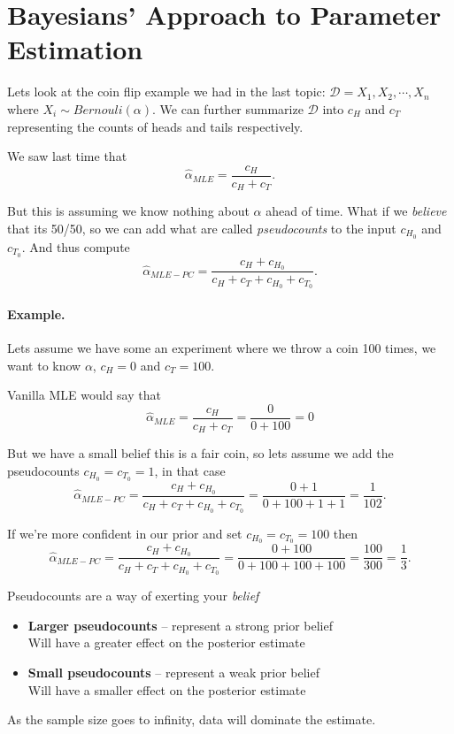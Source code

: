 \section{Bayesians' Approach to Parameter Estimation}
Lets look at the coin flip example we had in the last topic: 
 $\mathcal{D} = X_1, X_2, \cdots, X_n$ 
where $X_i \sim Bernouli(\alpha)$.
We can further summarize $\mathcal{D}$ into $c_H$ and $c_T$ 
representing the counts of heads and tails respectively. 

We saw last time that \[\hat\alpha_{MLE} = \frac{c_H}{c_H+c_T}.\]

But this is assuming we know nothing about $\alpha$ ahead of time. 
What if we \textit{believe} that its 50/50, so we can add what are called \emph{pseudocounts}
to the input $c_{H_0}$ and $c_{T_0}$.
And thus compute 
\[\hat\alpha_{MLE-PC} = \frac{c_H+c_{H_0}}{c_H+c_T+c_{H_0}+c_{T_0}}.\]

\paragraph{Example. }
Lets assume we have some an experiment where we throw a coin 100 times, we want to know $\alpha$, $c_H=0$ and $c_T=100$.

Vanilla MLE would say that 
\[\hat\alpha_{MLE} = \frac{c_H}{c_H+c_T} = \frac{0}{0 + 100} = 0\]
  
But we have a small belief this is a fair coin, so lets assume we add the pseudocounts $c_{H_0}=c_{T_0}=1$, 
in that case 
\[\hat\alpha_{MLE-PC} = \frac{c_H+c_{H_0}}{c_H+c_T+c_{H_0}+c_{T_0}}=\frac{0+1}{0+100+1+1} = \frac{1}{102}.\]

If we're more confident in our prior and set  $c_{H_0}=c_{T_0}=100$ then
\[\hat\alpha_{MLE-PC} = \frac{c_H+c_{H_0}}{c_H+c_T+c_{H_0}+c_{T_0}}=\frac{0+100}{0+100+100+100} = \frac{100}{300} = \frac{1}{3}.\]

Pseudocounts are a way of exerting your \textit{belief}
\begin{itemize}
\item[] \textbf{Larger pseudocounts} – represent a strong prior belief\\\hspace*{3em}
Will have a greater effect on the posterior estimate
\item[] \textbf{Small pseudocounts} – represent a weak prior belief\\\hspace*{3em}
Will have a smaller effect on the posterior estimate
\end{itemize}

As the sample size goes to infinity, data will dominate the estimate.

